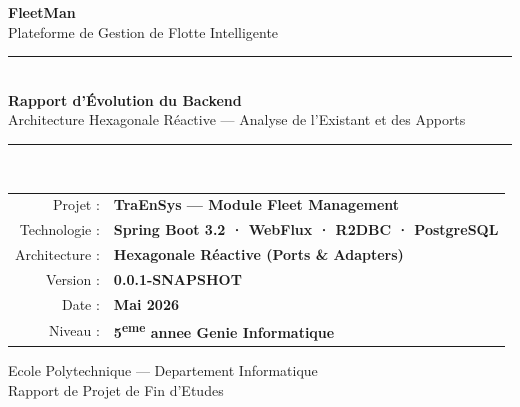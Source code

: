 \documentclass[12pt,a4paper]{report}
\begin{document}
\begin{titlepage}
  \pagecolor{fleetdark}
  \color{white}
  \centering
  \vspace*{2cm}

  {\fontsize{60}{72}\selectfont\bfseries\textcolor{fleetblue}{FleetMan}}\\[0.5cm]
  {\Large\textcolor{white!70}{Plateforme de Gestion de Flotte Intelligente}}\\[3cm]

  \textcolor{fleetblue}{\rule{0.8\textwidth}{2pt}}\\[1cm]

  {\LARGE\bfseries Rapport d'Évolution du Backend}\\[0.5cm]
  {\large Architecture Hexagonale Réactive — Analyse de l'Existant et des Apports}\\[1cm]

  \textcolor{fleetblue}{\rule{0.8\textwidth}{1pt}}\\[2cm]

  \begin{tabular}{rl}
    \textcolor{white!60}{Projet :}       & \textbf{TraEnSys — Module Fleet Management} \\[0.3cm]
    \textcolor{white!60}{Technologie :}  & \textbf{Spring Boot 3.2 · WebFlux · R2DBC · PostgreSQL} \\[0.3cm]
    \textcolor{white!60}{Architecture :} & \textbf{Hexagonale Réactive (Ports \& Adapters)} \\[0.3cm]
    \textcolor{white!60}{Version :}      & \textbf{0.0.1-SNAPSHOT} \\[0.3cm]
    \textcolor{white!60}{Date :}         & \textbf{Mai 2026} \\[0.3cm]
    \textcolor{white!60}{Niveau :}       & \textbf{5\textsuperscript{eme} annee Genie Informatique} \\
  \end{tabular}

  \vfill

  {\small\textcolor{white!50}{Ecole Polytechnique --- Departement Informatique}}\\
  {\small\textcolor{white!50}{Rapport de Projet de Fin d'Etudes}}

\end{titlepage}
\nopagecolor
\end{document}
